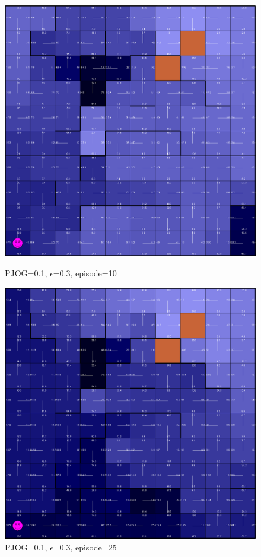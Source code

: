 \documentclass[11pt]{article}
\begin{document}
\begin{figure}[!htb]
   \begin{minipage}{0.4\textwidth}
     \centering
     \includegraphics[width=1.2\linewidth]{../figures/q2_3_10.png}
     \caption{PJOG=0.1, $\epsilon$=0.3, episode=10}\label{Fig:q2_3_10}
   \end{minipage}\hfill
   \begin{minipage}{0.4\textwidth}
     \centering
     \includegraphics[width=1.2\linewidth]{../figures/q2_3_25.png}
     \caption{PJOG=0.1, $\epsilon$=0.3, episode=25}\label{Fig:q2_3_25}
   \end{minipage}
\end{figure}
\end{document}

